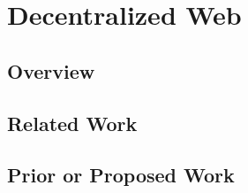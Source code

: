 \section{Decentralized Web}
\label{sec:web3}

\subsection{Overview}


\subsection{Related Work}


\subsection{Prior or Proposed Work}
